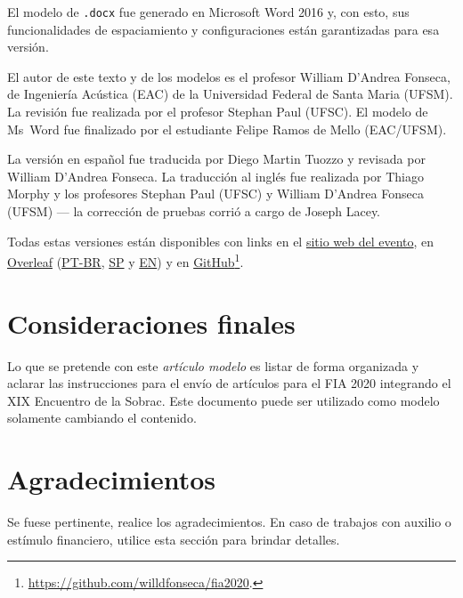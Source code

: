 \documentclass[12pt, a4paper, twoside, twocolumn]{article}
\begin{document}
El modelo de \texttt{.docx} fue generado en Microsoft Word 2016 y, con esto, sus funcionalidades de espaciamiento y configuraciones están garantizadas para esa versión.

El autor de este texto y de los modelos es el profesor William D'Andrea Fonseca, de Ingeniería Acústica (EAC) de la Universidad Federal de Santa Maria (UFSM).
%
La revisión fue realizada por el profesor Stephan Paul (UFSC).
El modelo de Ms~Word fue finalizado por el estudiante Felipe Ramos de Mello (EAC/UFSM).

La versión en español fue traducida por Diego Martin Tuozzo y revisada por William D'Andrea Fonseca.
%
La traducción al inglés fue realizada por Thiago Morphy y los profesores Stephan Paul (UFSC) y William D'Andrea Fonseca (UFSM) --- la corrección de pruebas corrió a cargo de Joseph Lacey. 

Todas estas versiones están disponibles con links en el \href{http://fia2020.com.br}{sitio web del evento}, en \href{https://www.overleaf.com/read/rszcxtwshzfr}{Overleaf} (\href{https://www.overleaf.com/read/rnfjxkknksnd}{PT-BR}, \href{https://www.overleaf.com/read/rszcxtwshzfr}{SP} y \href{https://www.overleaf.com/read/hgryywpgmxdx}{EN}) y en \href{https://github.com/willdfonseca/fia2020}{GitHub}\footnote{\url{https://github.com/willdfonseca/fia2020}.}.

\section{Consideraciones finales}

Lo que se pretende con este \textit{artículo modelo} es listar de forma organizada y aclarar las instrucciones para el envío de artículos para el FIA 2020 integrando el XIX Encuentro de la Sobrac. Este documento puede ser utilizado como modelo solamente cambiando el contenido.

\section{Agradecimientos}

Se fuese pertinente, realice los agradecimientos.
%
En caso de trabajos con auxilio o estímulo financiero, utilice esta sección para brindar detalles.
\end{document}

